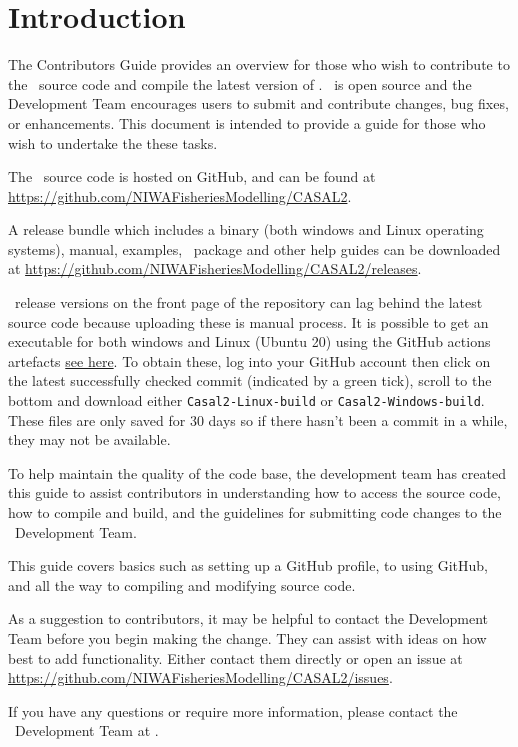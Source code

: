 \section{Introduction\label{sec:Introduction}}

The Contributors Guide provides an overview for those who wish to contribute to the \CNAME\ source code and compile the latest version of \CNAME. \CNAME\ is open source and the Development Team encourages users to submit and contribute changes, bug fixes, or enhancements. This document is intended to provide a guide for those who wish to undertake the these tasks. 

The \CNAME\ source code is hosted on GitHub, and can be found at \url{https://github.com/NIWAFisheriesModelling/CASAL2}.

A release bundle which includes a binary (both windows and Linux operating systems), manual, examples, \R\  package and other help guides can be downloaded at \url{https://github.com/NIWAFisheriesModelling/CASAL2/releases}. 

\CNAME\ release versions on the front page of the repository can lag behind the latest source code because uploading these is manual process. It is possible to get an executable for both windows and Linux (Ubuntu 20) using the GitHub actions artefacts \href{https://github.com/NIWAFisheriesModelling/CASAL2/actions}{see here}. To obtain these, log into your GitHub account then click on the latest successfully checked commit (indicated by a green tick), scroll to the bottom and download either \texttt{Casal2-Linux-build} or \texttt{Casal2-Windows-build}. These files are only saved for 30 days so if there hasn't been a commit in a while, they may not be available.

To help maintain the quality of the code base, the development team has created this guide to assist contributors in understanding how to access the source code, how to compile and build, and the guidelines for submitting code changes to the \CNAME\ Development Team.  

This guide covers basics such as setting up a GitHub profile, to using GitHub, and all the way to compiling and modifying source code. 

As a suggestion to contributors, it may be helpful to contact the Development Team before you begin making the change. They can assist with ideas on how best to add functionality. Either contact them directly or open an issue at \url{https://github.com/NIWAFisheriesModelling/CASAL2/issues}. 

If you have any questions or require more information, please contact the \CNAME\ Development Team at \email.